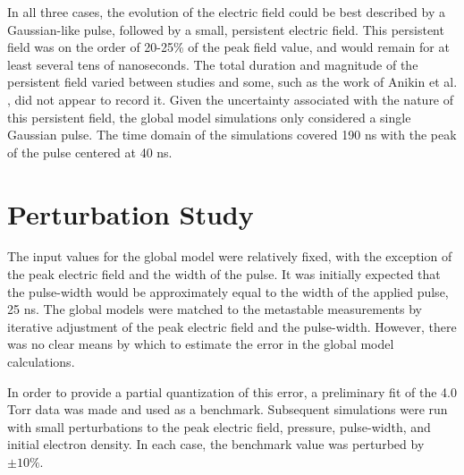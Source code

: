 In all three cases, the evolution of the electric field could be best described
by a Gaussian-like pulse, followed by a small, persistent electric field. This
persistent field was on the order of 20-25\% of the peak field value, and would
remain for at least several tens of nanoseconds. The total duration and
magnitude of the persistent field varied between studies and some, such as the
work of Anikin et al. \cite{Anikin1998}, did not appear to record it. Given the
uncertainty associated with the nature of this persistent field, the global
model simulations only considered a single Gaussian pulse. The time domain of
the simulations covered 190 ns with the peak of the pulse centered at 40 ns.

\section{Perturbation Study}

The input values for the global model were relatively fixed, with the exception
of the peak electric field and the width of the pulse. It was initially expected
that the pulse-width would be approximately equal to the width of the applied
pulse, 25 ns. The global models were matched to the metastable measurements by
iterative adjustment of the peak electric field and the pulse-width. However,
there was no clear means by which to estimate the error in the global model
calculations.

In order to provide a partial quantization of this error, a preliminary fit of
the 4.0 Torr data was made and used as a benchmark. Subsequent simulations were
run with small perturbations to the peak electric field, pressure, pulse-width,
and initial electron density. In each case, the benchmark value was perturbed by
$\pm10\%$.

